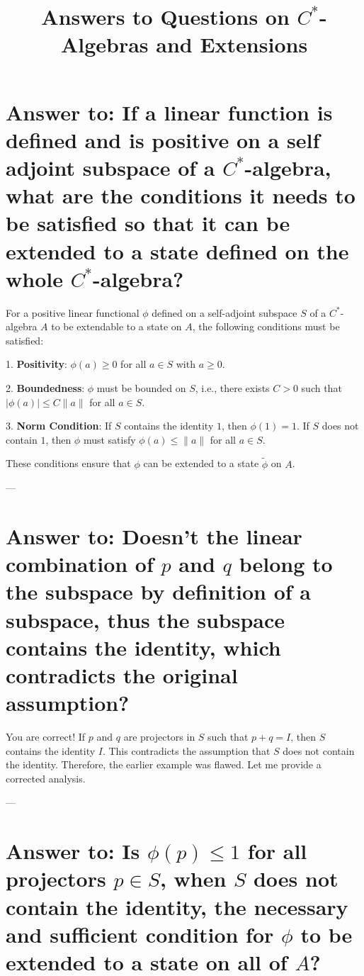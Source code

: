 \documentclass{article}
\title{Answers to Questions on \( C^* \)-Algebras and Extensions}
\author{}
\date{}
\begin{document}
\maketitle

\section*{Answer to: If a linear function is defined and is positive on a self adjoint subspace of a \( C^* \)-algebra, what are the conditions it needs to be satisfied so that it can be extended to a state defined on the whole \( C^* \)-algebra?}

For a positive linear functional \( \phi \) defined on a self-adjoint subspace \( S \) of a \( C^* \)-algebra \( A \) to be extendable to a state on \( A \), the following conditions must be satisfied:

1. \textbf{Positivity}: \( \phi(a) \geq 0 \) for all \( a \in S \) with \( a \geq 0 \).

2. \textbf{Boundedness}: \( \phi \) must be bounded on \( S \), i.e., there exists \( C > 0 \) such that \( |\phi(a)| \leq C \|a\| \) for all \( a \in S \).

3. \textbf{Norm Condition}: If \( S \) contains the identity \( 1 \), then \( \phi(1) = 1 \). If \( S \) does not contain \( 1 \), then \( \phi \) must satisfy \( \phi(a) \leq \|a\| \) for all \( a \in S \).

These conditions ensure that \( \phi \) can be extended to a state \( \tilde{\phi} \) on \( A \).

---

\section*{Answer to: Doesn't the linear combination of \( p \) and \( q \) belong to the subspace by definition of a subspace, thus the subspace contains the identity, which contradicts the original assumption?}

You are correct! If \( p \) and \( q \) are projectors in \( S \) such that \( p + q = I \), then \( S \) contains the identity \( I \). This contradicts the assumption that \( S \) does not contain the identity. Therefore, the earlier example was flawed. Let me provide a corrected analysis.

---

\section*{Answer to: Is \( \phi(p) \leq 1 \) for all projectors \( p \in S \), when \( S \) does not contain the identity, the necessary and sufficient condition for \( \phi \) to be extended to a state on all of \( A \)?}
\end{document}
